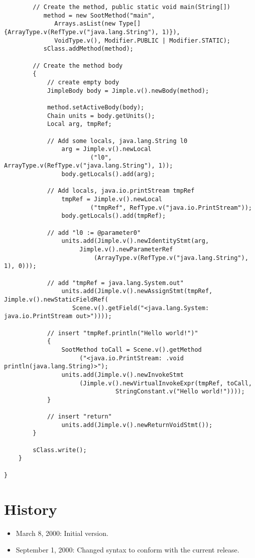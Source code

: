 \documentclass{article}
\begin{document}
\begin{verbatim}
        // Create the method, public static void main(String[])
           method = new SootMethod("main",
              Arrays.asList(new Type[] {ArrayType.v(RefType.v("java.lang.String"), 1)}),
              VoidType.v(), Modifier.PUBLIC | Modifier.STATIC);
           sClass.addMethod(method);
           
        // Create the method body
        {
            // create empty body
            JimpleBody body = Jimple.v().newBody(method);
            
            method.setActiveBody(body);
            Chain units = body.getUnits();
            Local arg, tmpRef;
            
            // Add some locals, java.lang.String l0
                arg = Jimple.v().newLocal
                        ("l0", ArrayType.v(RefType.v("java.lang.String"), 1));
                body.getLocals().add(arg);
            
            // Add locals, java.io.printStream tmpRef
                tmpRef = Jimple.v().newLocal
                        ("tmpRef", RefType.v("java.io.PrintStream"));
                body.getLocals().add(tmpRef);
                
            // add "l0 := @parameter0"
                units.add(Jimple.v().newIdentityStmt(arg, 
                     Jimple.v().newParameterRef
                         (ArrayType.v(RefType.v("java.lang.String"), 1), 0)));
            
            // add "tmpRef = java.lang.System.out"
                units.add(Jimple.v().newAssignStmt(tmpRef, Jimple.v().newStaticFieldRef(
                   Scene.v().getField("<java.lang.System: java.io.PrintStream out>"))));
            
            // insert "tmpRef.println("Hello world!")"
            {
                SootMethod toCall = Scene.v().getMethod
                     ("<java.io.PrintStream: .void println(java.lang.String)>");
                units.add(Jimple.v().newInvokeStmt
                     (Jimple.v().newVirtualInvokeExpr(tmpRef, toCall, 
                               StringConstant.v("Hello world!"))));
            }                        
            
            // insert "return"
                units.add(Jimple.v().newReturnVoidStmt());
        }

        sClass.write();
    }
        
}
\end{verbatim}

\section{History}
\begin{itemize}
\item March 8, 2000: Initial version.
\item September 1, 2000: Changed syntax to conform with the current release.
\end{itemize}
\end{document}

